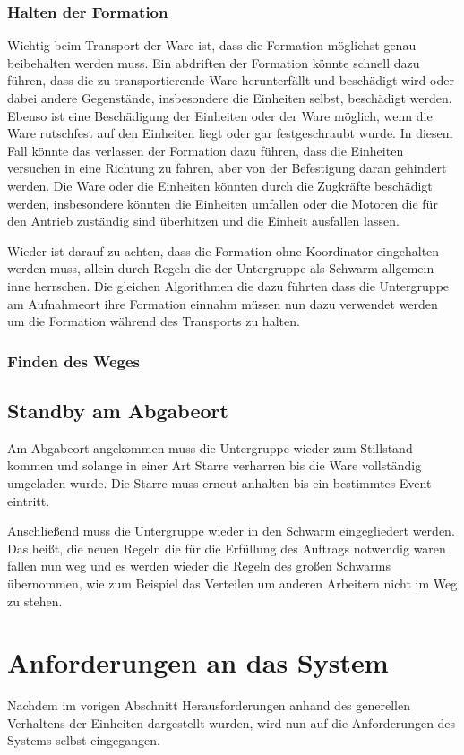 \subsubsection*{Halten der Formation}
Wichtig beim Transport der Ware ist, dass die Formation möglichst genau beibehalten werden muss.
Ein abdriften der Formation könnte schnell dazu führen, dass die zu transportierende Ware herunterfällt und beschädigt wird oder dabei andere Gegenstände, insbesondere die Einheiten selbst, beschädigt werden.
Ebenso ist eine Beschädigung der Einheiten oder der Ware möglich, wenn die Ware rutschfest auf den Einheiten liegt oder gar festgeschraubt wurde.
In diesem Fall könnte das verlassen der Formation dazu führen, dass die Einheiten versuchen in eine Richtung zu fahren, aber von der Befestigung daran gehindert werden.
Die Ware oder die Einheiten könnten durch die Zugkräfte beschädigt werden, insbesondere könnten die Einheiten umfallen oder die Motoren die für den Antrieb zuständig sind überhitzen und die Einheit ausfallen lassen.

Wieder ist darauf zu achten, dass die Formation ohne Koordinator eingehalten werden muss, allein durch Regeln die der Untergruppe als Schwarm allgemein inne herrschen.
Die gleichen Algorithmen die dazu führten dass die Untergruppe am Aufnahmeort ihre Formation einnahm müssen nun dazu verwendet werden um die Formation während des Transports zu halten.

\subsubsection*{Finden des Weges}

\subsection*{Standby am Abgabeort}
Am Abgabeort angekommen muss die Untergruppe wieder zum Stillstand kommen und solange in einer Art Starre verharren bis die Ware vollständig umgeladen wurde.
Die Starre muss erneut anhalten bis ein bestimmtes Event eintritt.

Anschließend muss die Untergruppe wieder in den Schwarm eingegliedert werden.
Das heißt, die neuen Regeln die für die Erfüllung des Auftrags notwendig waren fallen nun weg und es werden wieder die Regeln des großen Schwarms übernommen, wie zum Beispiel das Verteilen um anderen Arbeitern nicht im Weg zu stehen.

\section{Anforderungen an das System}\label{sec:AnforderungenAnDasSystem}
Nachdem im vorigen Abschnitt Herausforderungen anhand des generellen Verhaltens der Einheiten dargestellt wurden, wird nun auf die Anforderungen des Systems selbst eingegangen.

